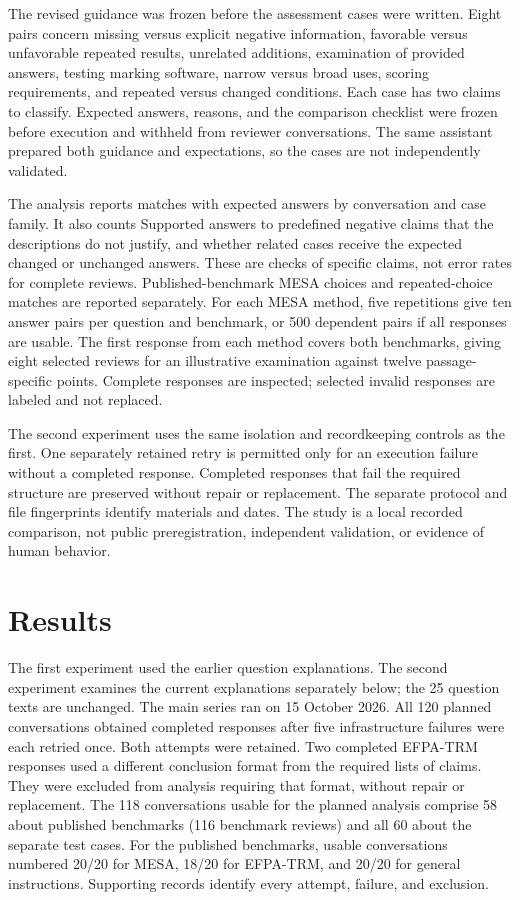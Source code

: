 \documentclass[10pt,conference]{IEEEtran}
\begin{document}
The revised guidance was frozen before the assessment cases were written. Eight pairs concern missing versus explicit negative information, favorable versus unfavorable repeated results, unrelated additions, examination of provided answers, testing marking software, narrow versus broad uses, scoring requirements, and repeated versus changed conditions. Each case has two claims to classify. Expected answers, reasons, and the comparison checklist were frozen before execution and withheld from reviewer conversations. The same assistant prepared both guidance and expectations, so the cases are not independently validated.

The analysis reports matches with expected answers by conversation and case family. It also counts Supported answers to predefined negative claims that the descriptions do not justify, and whether related cases receive the expected changed or unchanged answers. These are checks of specific claims, not error rates for complete reviews. Published-benchmark MESA choices and repeated-choice matches are reported separately. For each MESA method, five repetitions give ten answer pairs per question and benchmark, or 500 dependent pairs if all responses are usable. The first response from each method covers both benchmarks, giving eight selected reviews for an illustrative examination against twelve passage-specific points. Complete responses are inspected; selected invalid responses are labeled and not replaced.

The second experiment uses the same isolation and recordkeeping controls as the first. One separately retained retry is permitted only for an execution failure without a completed response. Completed responses that fail the required structure are preserved without repair or replacement. The separate protocol and file fingerprints identify materials and dates. The study is a local recorded comparison, not public preregistration, independent validation, or evidence of human behavior.

\section{Results}
The first experiment used the earlier question explanations. The second experiment examines the current explanations separately below; the 25 question texts are unchanged.
\label{sec:results}
The main series ran on 15 October 2026. All 120 planned conversations obtained completed responses after five infrastructure failures were each retried once. Both attempts were retained. Two completed EFPA-TRM responses used a different conclusion format from the required lists of claims. They were excluded from analysis requiring that format, without repair or replacement. The 118 conversations usable for the planned analysis comprise 58 about published benchmarks (116 benchmark reviews) and all 60 about the separate test cases. For the published benchmarks, usable conversations numbered 20/20 for MESA, 18/20 for EFPA-TRM, and 20/20 for general instructions. Supporting records identify every attempt, failure, and exclusion.
\end{document}
